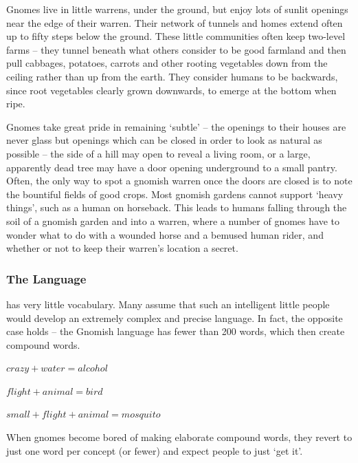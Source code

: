 \label{gnomishWarrens}

\renewcommand\npcsymbol{\Gn}


\noindent
Gnomes live in little warrens, under the ground, but enjoy lots of sunlit openings near the edge of their warren.
Their network of tunnels and homes extend often up to fifty \glspl{step} below the ground.
These little communities often keep two-level farms -- they tunnel beneath what others consider to be good farmland and then pull cabbages, potatoes, carrots and other rooting vegetables down from the ceiling rather than up from the earth.
They consider humans to be backwards, since root vegetables clearly grown downwards, to emerge at the bottom when ripe.

Gnomes take great pride in remaining `subtle' -- the openings to their houses are never glass but openings which can be closed in order to look as natural as possible -- the side of a hill may open to reveal a living room, or a large, apparently dead tree may have a door opening underground to a small pantry.
Often, the only way to spot a gnomish warren once the doors are closed is to note the bountiful fields of good crops.
Most gnomish gardens cannot support `heavy things', such as a human on horseback.
This leads to humans falling through the soil of a gnomish garden and into a warren, where a number of gnomes have to wonder what to do with a wounded horse and a bemused human rider, and whether or not to keep their warren's location a secret.

\subsubsection[The Gnomish Language]{The Language}
has very little vocabulary.
Many assume that such an intelligent little people would develop an extremely complex and precise language.
In fact, the opposite case holds -- the Gnomish language has fewer than 200 words, which then create compound words.

$crazy + water = alcohol$

$flight + animal = bird$

$small + flight + animal = mosquito$

When gnomes become bored of making elaborate compound words, they revert to just one word per concept (or fewer) and expect people to just `get it'.

